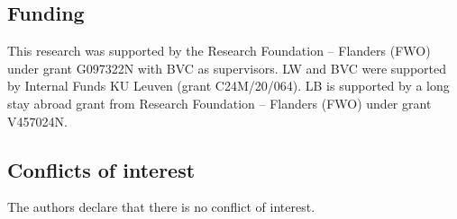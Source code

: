 \subsection*{Funding}
This research was supported by the Research Foundation -- Flanders (FWO) under grant G097322N with BVC as supervisors. LW and BVC were supported by Internal Funds KU Leuven (grant C24M/20/064). LB is supported by a long stay abroad grant from Research Foundation -- Flanders (FWO) under grant V457024N.

\subsection*{Conflicts of interest}
The authors declare that there is no conflict of interest.
